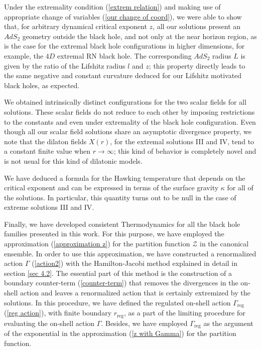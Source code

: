 \documentclass[sn-mathphys,Numbered]{sn-jnl}%
\theoremstyle{thmstyleone}%
\theoremstyle{thmstyletwo}%
\theoremstyle{thmstylethree}%
\begin{document}
Under the extremality condition (\ref{extrem relation}) and making use of appropriate change of variables (\ref{our change of coord}), we were able to show that, for arbitrary dynamical critical exponent $z$, all our solutions present an $AdS_2$ geometry outside the black hole, and not only at the near horizon region, as is the case for the extremal black hole configurations in higher dimensions, for example, the $4D$ extremal RN black hole. The corresponding $AdS_2$ radius $L$ is given by the ratio of the Lifshitz radius $l$ and $z$; this property directly leads to the same negative and constant curvature deduced for our Lifshitz motivated black holes, as expected. 

We obtained intrinsically distinct configurations for the two scalar fields for all solutions. These scalar fields do not reduce to each other by imposing restrictions to the constants and even under extremality of the black hole configuration. Even though all our scalar field solutions share an asymptotic divergence property, we note that the dilaton fields $X(r)$, for the extremal solutions III and IV, tend to a constant finite value when $r \rightarrow \infty$; this kind of behavior is completely novel and is not usual for this kind of dilatonic models.

We have deduced a formula for the Hawking temperature that depends on the critical exponent and can be expressed in terms of the surface gravity $\kappa$ for all of the solutions. In particular, this quantity turns out to be null in the case of extreme solutions III and IV.

Finally, we have developed consistent Thermodynamics for all the black hole families presented in this work. For this purpose, we have employed the approximation (\ref{approximation z}) for the partition function $\mathcal{Z}$ in the canonical ensemble. In order to use this approximation, we have constructed a renormalized action $\Gamma$ (\ref{action2}) with the Hamilton-Jacobi method explained in detail in section \ref{sec 4.2}. The essential part of this method is the construction of a boundary counter-term (\ref{counter-term}) that removes the divergences in the on-shell action  and leaves a renormalized action that is certainly extremized by the solutions. In this procedure, we have defined the regulated on-shell action $\Gamma_{\text{reg}}$ (\ref{reg action}), with finite boundary $r_{\text{reg}}$, as a part of the limiting procedure for evaluating the on-shell action $\Gamma$. Besides, we have employed $\Gamma_{\text{reg}}$ as the argument of the exponential in the approximation (\ref{z with Gamma}) for the partition function. 
\end{document}
